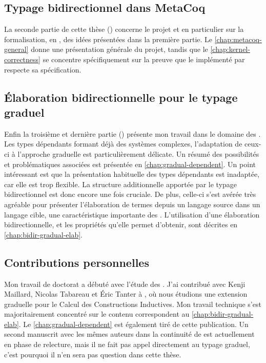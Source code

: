 \subsection{Typage bidirectionnel dans MetaCoq}

La seconde partie de cette thèse ()
concerne le projet 
et en particulier sur la formalisation, en , des idées présentées dans la
première partie. Le \cref{chap:metacoq-general} donne une présentation générale du
projet, tandis que le \cref{chap:kernel-correctness} se concentre spécifiquement
sur la preuve que le  implémenté par  respecte sa spécification.

\subsection{Élaboration bidirectionnelle pour le typage graduel}

Enfin la troisième et dernière partie ()
présente mon travail
dans le domaine des . Les types dépendants formant déjà des systèmes
complexes, l’adaptation de ceux-ci à l’approche graduelle est particulièrement
délicate. Un résumé des possibilités et problématiques associées est présentée
en \cref{chap:gradual-dependent}.
Un point intéressant est que la présentation habituelle
des types dépendants est inadaptée,
car elle est trop flexible. La structure additionnelle apportée
par le typage bidirectionnel est donc encore une fois cruciale.
De plus, celle-ci s’est avérée très agréable pour présenter
l’élaboration de termes depuis un langage source dans un langage cible, une
caractéristique importante des .
L’utilisation d’une élaboration bidirectionnelle, et les propriétés qu’elle
permet d’obtenir, sont décrites en \cref{chap:bidir-gradual-elab}.

\subsection{Contributions personnelles}

Mon travail de doctorat a débuté avec l’étude des  .
J’ai contribué avec Kenji Maillard, Nicolas Tabareau et Éric Tanter à
, où nous étudions une extension graduelle
pour le Calcul des Constructions Inductives. Mon travail technique s’est
majoritairement concentré sur le contenu correspondent au \cref{chap:bidir-gradual-elab}.
Le \cref{chap:gradual-dependent} est également tiré de cette publication.
Un second manuscrit avec les mêmes auteurs dans la continuité de
\cite{LennonBertrand2020} est actuellement en phase de relecture, mais il
ne fait pas appel directement au typage graduel, c’est pourquoi il n’en
sera pas question dans cette thèse.

